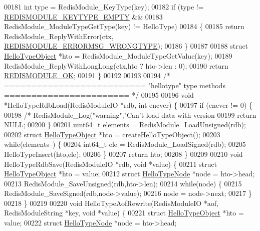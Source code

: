 \begin{DoxyCode}
00181     \textcolor{keywordtype}{int} type = RedisModule\_KeyType(key);
00182     \textcolor{keywordflow}{if} (type != \hyperlink{redismodule_8h_adf2819748eb5e89c621d2c9c65c0b5f7}{REDISMODULE\_KEYTYPE\_EMPTY} &&
00183         RedisModule\_ModuleTypeGetType(key) != HelloType)
00184     \{
00185         \textcolor{keywordflow}{return} RedisModule\_ReplyWithError(ctx,
      \hyperlink{redismodule_8h_ab897689b0673a1e4cbc097cb5bce04c1}{REDISMODULE\_ERRORMSG\_WRONGTYPE});
00186     \}
00187 
00188     \textcolor{keyword}{struct} \hyperlink{structHelloTypeObject}{HelloTypeObject} *hto = RedisModule\_ModuleTypeGetValue(key);
00189     RedisModule\_ReplyWithLongLong(ctx,hto ? hto->len : 0);
00190     \textcolor{keywordflow}{return} \hyperlink{redismodule_8h_a1bc5bfd69abcd378ff52c640adc5418d}{REDISMODULE\_OK};
00191 \}
00192 
00193 
00194 \textcolor{comment}{/* ========================== "hellotype" type methods ======================= */}
00195 
00196 \textcolor{keywordtype}{void} *HelloTypeRdbLoad(RedisModuleIO *rdb, \textcolor{keywordtype}{int} encver) \{
00197     \textcolor{keywordflow}{if} (encver != 0) \{
00198         \textcolor{comment}{/* RedisModule\_Log("warning","Can't load data with version %
00199         \textcolor{keywordflow}{return} NULL;
00200     \}
00201     uint64\_t elements = RedisModule\_LoadUnsigned(rdb);
00202     \textcolor{keyword}{struct} \hyperlink{structHelloTypeObject}{HelloTypeObject} *hto = createHelloTypeObject();
00203     \textcolor{keywordflow}{while}(elements--) \{
00204         int64\_t ele = RedisModule\_LoadSigned(rdb);
00205         HelloTypeInsert(hto,ele);
00206     \}
00207     \textcolor{keywordflow}{return} hto;
00208 \}
00209 
00210 \textcolor{keywordtype}{void} HelloTypeRdbSave(RedisModuleIO *rdb, \textcolor{keywordtype}{void} *value) \{
00211     \textcolor{keyword}{struct} \hyperlink{structHelloTypeObject}{HelloTypeObject} *hto = value;
00212     \textcolor{keyword}{struct} \hyperlink{structHelloTypeNode}{HelloTypeNode} *node = hto->head;
00213     RedisModule\_SaveUnsigned(rdb,hto->len);
00214     \textcolor{keywordflow}{while}(node) \{
00215         RedisModule\_SaveSigned(rdb,node->value);
00216         node = node->next;
00217     \}
00218 \}
00219 
00220 \textcolor{keywordtype}{void} HelloTypeAofRewrite(RedisModuleIO *aof, RedisModuleString *key, \textcolor{keywordtype}{void} *value) \{
00221     \textcolor{keyword}{struct} \hyperlink{structHelloTypeObject}{HelloTypeObject} *hto = value;
00222     \textcolor{keyword}{struct} \hyperlink{structHelloTypeNode}{HelloTypeNode} *node = hto->head;
}
\end{DoxyCode}
